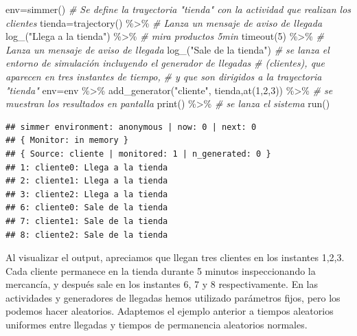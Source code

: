 \documentclass[
]{book}
\newenvironment{Shaded}{\begin{snugshade}}{\end{snugshade}}
\newcommand{\CommentTok}[1]{\textcolor[rgb]{0.56,0.35,0.01}{\textit{#1}}}
\newcommand{\DecValTok}[1]{\textcolor[rgb]{0.00,0.00,0.81}{#1}}
\newcommand{\FunctionTok}[1]{\textcolor[rgb]{0.00,0.00,0.00}{#1}}
\newcommand{\NormalTok}[1]{#1}
\newcommand{\OtherTok}[1]{\textcolor[rgb]{0.56,0.35,0.01}{#1}}
\newcommand{\SpecialCharTok}[1]{\textcolor[rgb]{0.00,0.00,0.00}{#1}}
\newcommand{\StringTok}[1]{\textcolor[rgb]{0.31,0.60,0.02}{#1}}
\theoremstyle{definition}
\theoremstyle{definition}
\theoremstyle{definition}
\theoremstyle{definition}
\theoremstyle{remark}
\begin{document}
\begin{Shaded}
\begin{Highlighting}[]
\NormalTok{env}\OtherTok{=}\FunctionTok{simmer}\NormalTok{()}
\CommentTok{\# Se define la trayectoria "tienda" con la actividad que realizan los clientes}
\NormalTok{tienda}\OtherTok{=}\FunctionTok{trajectory}\NormalTok{() }\SpecialCharTok{\%\textgreater{}\%}
  \CommentTok{\# Lanza un mensaje de aviso de llegada}
  \FunctionTok{log\_}\NormalTok{(}\StringTok{"Llega a la tienda"}\NormalTok{) }\SpecialCharTok{\%\textgreater{}\%}
  \CommentTok{\# mira productos 5min}
  \FunctionTok{timeout}\NormalTok{(}\DecValTok{5}\NormalTok{) }\SpecialCharTok{\%\textgreater{}\%} 
  \CommentTok{\# Lanza un mensaje de aviso de llegada}
  \FunctionTok{log\_}\NormalTok{(}\StringTok{"Sale de la tienda"}\NormalTok{)}
\CommentTok{\# se lanza el entorno de simulación incluyendo el generador de llegadas }
\CommentTok{\# (clientes), que aparecen en tres instantes de tiempo,}
\CommentTok{\# y que son dirigidos a la trayectoria "tienda"}
\NormalTok{env}\OtherTok{=}\NormalTok{env }\SpecialCharTok{\%\textgreater{}\%}
  \FunctionTok{add\_generator}\NormalTok{(}\StringTok{"cliente"}\NormalTok{, tienda,}\FunctionTok{at}\NormalTok{(}\DecValTok{1}\NormalTok{,}\DecValTok{2}\NormalTok{,}\DecValTok{3}\NormalTok{)) }\SpecialCharTok{\%\textgreater{}\%}
  \CommentTok{\# se muestran los resultados en pantalla}
  \FunctionTok{print}\NormalTok{() }\SpecialCharTok{\%\textgreater{}\%}
  \CommentTok{\# se lanza el sistema}
  \FunctionTok{run}\NormalTok{()}
\end{Highlighting}
\end{Shaded}

\begin{verbatim}
## simmer environment: anonymous | now: 0 | next: 0
## { Monitor: in memory }
## { Source: cliente | monitored: 1 | n_generated: 0 }
## 1: cliente0: Llega a la tienda
## 2: cliente1: Llega a la tienda
## 3: cliente2: Llega a la tienda
## 6: cliente0: Sale de la tienda
## 7: cliente1: Sale de la tienda
## 8: cliente2: Sale de la tienda
\end{verbatim}

Al visualizar el output, apreciamos que llegan tres clientes en los instantes 1,2,3. Cada cliente permanece en la tienda durante 5 minutos inspeccionando la mercancía, y después sale en los instantes 6, 7 y 8 respectivamente. En las actividades y generadores de llegadas hemos utilizado parámetros fijos, pero los podemos hacer aleatorios. Adaptemos el ejemplo anterior a tiempos aleatorios uniformes entre llegadas y tiempos de permanencia aleatorios normales.
\end{document}
